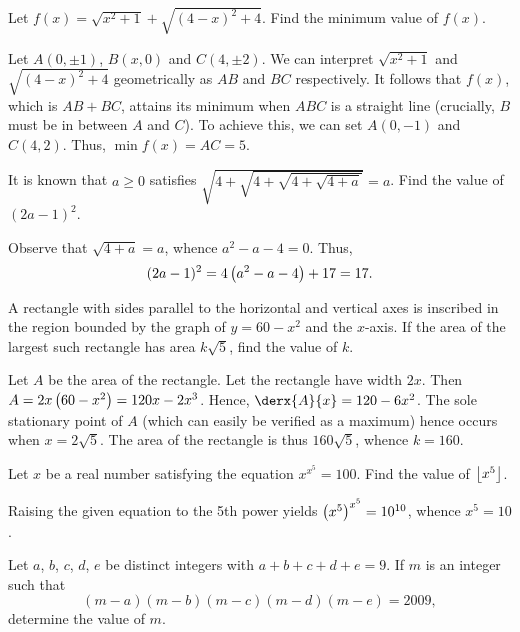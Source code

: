 \begin{question}[5]\label{A::2024-O-1-8}
    Let $f(x) = \sqrt{x^2 + 1} + \sqrt{(4-x)^2 + 4}$. Find the minimum value of $f(x)$.
\end{question}

Let $A(0, \pm1)$, $B(x, 0)$ and $C(4, \pm2)$. We can interpret  $\sqrt{x^2 + 1}$ and $\sqrt{(4-x)^2 + 4}$ geometrically as $AB$ and $BC$ respectively. It follows that $f(x)$, which is $AB + BC$, attains its minimum when $ABC$ is a straight line (crucially, $B$ must be in between $A$ and $C$). To achieve this, we can set $A(0, -1)$ and $C(4, 2)$. Thus, $\min f(x) = AC = 5$.

\begin{question}[17]\label{A::2024-O-1-9}
    It is known that $a \geq 0$ satisfies $\sqrt{4 + \sqrt{4 + \sqrt{4 + \sqrt{4 + a}}}} = a$. Find the value of $(2a - 1)^2$.
\end{question}

Observe that $\sqrt{4 + a} = a$, whence $a^2 - a - 4 = 0$. Thus, \[(2a-1)^2 = 4\left( a^2 - a - 4 \right) + 17 = 17.\]

\begin{question}[160]\label{A::2024-O-1-10}
    A rectangle with sides parallel to the horizontal and vertical axes is inscribed in the region bounded by the graph of $y = 60 - x^2$ and the $x$-axis. If the area of the largest such rectangle has area $k\sqrt 5$, find the value of $k$.
\end{question}

Let $A$ be the area of the rectangle. Let the rectangle have width $2x$. Then $A = 2x\left( 60 - x^2 \right) = 120x - 2x^3$. Hence, $\derx{A}{x} = 120 - 6x^2$. The sole stationary point of $A$ (which can easily be verified as a maximum) hence occurs when $x = 2\sqrt5$. The area of the rectangle is thus $160\sqrt5$, whence $k = 160$.

\begin{question}[10]\label{A::2024-O-1-11}
    Let $x$ be a real number satisfying the equation $x^{x^5} = 100$. Find the value of $\left\lfloor x^5 \right\rfloor$.
\end{question}

Raising the given equation to the 5th power yields $\left( x^5 \right)^{x^5} = 10^{10}$, whence $x^5 = 10$.

\begin{question}[10]\label{A::2024-O-1-12}
    Let $a$, $b$, $c$, $d$, $e$ be distinct integers with $a + b + c + d + e = 9$. If $m$ is an integer such that \[(m-a)(m-b)(m-c)(m-d)(m-e) = 2009,\] determine the value of $m$.
\end{question}

